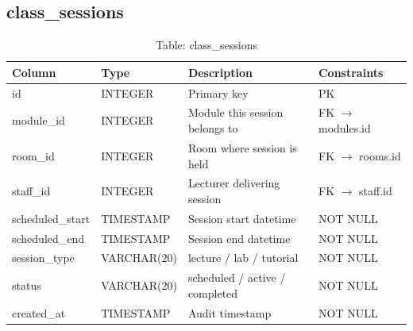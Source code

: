 \documentclass[12pt,a4paper]{report}
\begin{document}
\subsection{class\_sessions}
\begin{table}[H]
\centering\small
\caption{Table: class\_sessions}
\begin{tabularx}{\linewidth}{llXl}
\toprule
\textbf{Column} & \textbf{Type} & \textbf{Description} & \textbf{Constraints} \\
\midrule
id               & INTEGER      & Primary key                       & PK \\
module\_id       & INTEGER      & Module this session belongs to    & FK $\to$ modules.id \\
room\_id         & INTEGER      & Room where session is held        & FK $\to$ rooms.id \\
staff\_id        & INTEGER      & Lecturer delivering session       & FK $\to$ staff.id \\
scheduled\_start & TIMESTAMP    & Session start datetime            & NOT NULL \\
scheduled\_end   & TIMESTAMP    & Session end datetime              & NOT NULL \\
session\_type    & VARCHAR(20)  & lecture / lab / tutorial          & NOT NULL \\
status           & VARCHAR(20)  & scheduled / active / completed    & NOT NULL \\
created\_at      & TIMESTAMP    & Audit timestamp                   & NOT NULL \\
\bottomrule
\end{tabularx}
\end{table}
\end{document}
